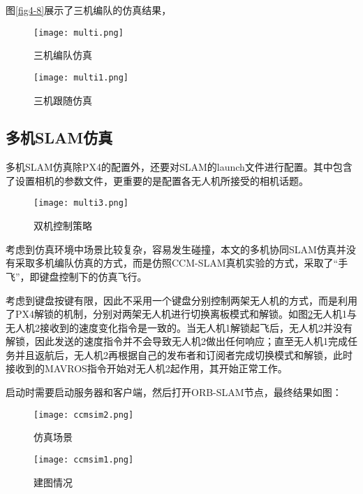 图\ref{fig4-8}展示了三机编队的仿真结果，
~\\
\begin{figure}[htbp]
	\centering
	\begin{minipage}[t]{0.45\columnwidth} %
		\centering
		\texttt{[image: multi.png]}
		\caption{三机编队仿真}
		\label{fig4-8}
	\end{minipage}
	\begin{minipage}[t]{0.45\columnwidth}
		\centering
		\texttt{[image: multi1.png]}
		\caption{三机跟随仿真}
		\label{fig4-8-1}
	\end{minipage}
\end{figure}


\subsection{多机SLAM仿真} \label{4.3.3}

多机SLAM仿真除PX4的配置外，还要对SLAM的launch文件进行配置。其中包含了设置相机的参数文件，更重要的是配置各无人机所接受的相机话题。
~\\
\begin{figure}[!ht]
	\centering
	\texttt{[image: multi3.png]}
	\caption{双机控制策略}
	\label{fig-multicontrol}
\end{figure}

考虑到仿真环境中场景比较复杂，容易发生碰撞，本文的多机协同SLAM仿真并没有采取多机编队仿真的方式，而是仿照CCM-SLAM真机实验的方式，采取了“手飞”，即键盘控制下的仿真飞行。

考虑到键盘按键有限，因此不采用一个键盘分别控制两架无人机的方式，而是利用了PX4解锁的机制，分别对两架无人机进行切换离板模式和解锁。如图\ref{fig-multicontrol}无人机1与无人机2接收到的速度变化指令是一致的。当无人机1解锁起飞后，无人机2并没有解锁，因此发送的速度指令并不会导致无人机2做出任何响应；直至无人机1完成任务并且返航后，无人机2再根据自己的发布者和订阅者完成切换模式和解锁，此时接收到的MAVROS指令开始对无人机2起作用，其开始正常工作。

启动时需要启动服务器和客户端，然后打开ORB-SLAM节点，最终结果如图：
~\\
\begin{figure}[htbp]
	\centering
	\begin{minipage}[t]{0.45\columnwidth} %
		\centering
		\texttt{[image: ccmsim2.png]}
		\caption{仿真场景}
		\label{fig4-9}
	\end{minipage}
	\begin{minipage}[t]{0.45\columnwidth}
		\centering
		\texttt{[image: ccmsim1.png]}
		\caption{建图情况}
		\label{fig4-9-1}
	\end{minipage}
\end{figure}

